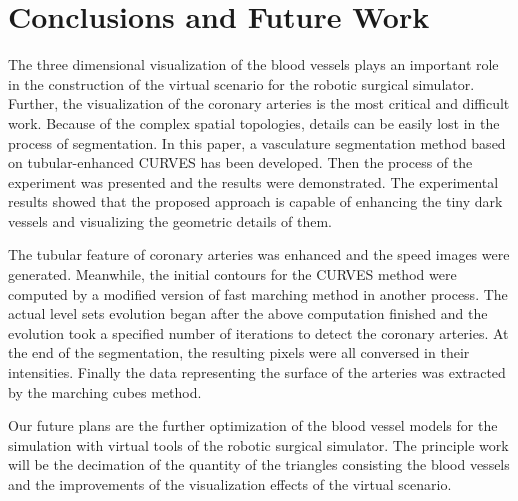 \section{Conclusions and Future Work}
\label{sec4_3}

The three dimensional visualization of the blood vessels plays an important role in the construction of the virtual scenario for the robotic surgical simulator.
Further, the visualization of the coronary arteries is the most critical and difficult work.
Because of the complex spatial topologies, details can be easily lost in the process of segmentation.
In this paper, a vasculature segmentation method based on tubular-enhanced CURVES has been developed.
Then the process of the experiment was presented and the results were demonstrated.
The experimental results showed that the proposed approach is capable of enhancing the tiny dark vessels and visualizing the geometric details of them.

The tubular feature of coronary arteries was enhanced and the speed images were generated.
Meanwhile, the initial contours for the CURVES method were computed by a modified version of fast marching method in another process.
The actual level sets evolution began after the above computation finished and the evolution took a specified number of iterations to detect the coronary arteries.
At the end of the segmentation, the resulting pixels were all conversed in their intensities.
Finally the data representing the surface of the arteries was extracted by the marching cubes method.

Our future plans are the further optimization of the blood vessel models for the simulation with virtual tools of the robotic surgical simulator.
The principle work will be the decimation of the quantity of the triangles consisting the blood vessels and the improvements of the visualization effects of the virtual scenario. 
